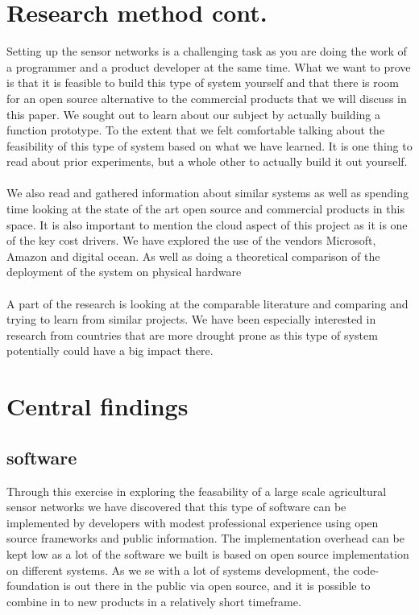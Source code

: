\documentclass[]{uiophd}
\begin{document}
\section{Research method cont.}
Setting up the sensor networks is a challenging task as you are doing the work of a programmer and a product developer at the same time. What we want to prove is that it is feasible to build this type of system yourself and that there is room for an open source alternative to the commercial products that we will discuss in this paper. We sought out to learn about our subject by actually building a function prototype. To the extent that we felt comfortable talking about the feasibility of this type of system based on what we have learned. It is one thing to read about prior experiments, but a whole other to actually build it out yourself.
\\\\
We also read and gathered information about similar systems as well as spending time looking at the state of the art open source and commercial products in this space. It is also important to mention the cloud aspect of this project as it is one of the key cost drivers. We have explored the use of the vendors Microsoft, Amazon and digital ocean. As well as doing a theoretical comparison of the deployment of the system on physical hardware
\\\\
A part of the research is looking at the comparable literature and comparing and trying to learn from similar projects. We have been especially interested in research from countries that are more drought prone as this type of system potentially could have a big impact there.



\section{Central findings}
\subsection{software}
Through this exercise in exploring the feasability of a large scale agricultural sensor networks we have discovered that this type of software can be implemented by developers with modest professional experience using open source frameworks and public information. The implementation overhead can be kept low as a lot of the software we built is based on open source implementation on different systems. As we se with a lot of systems development, the code-foundation is out there in the public via open source, and it is possible to combine in to new products in a relatively short timeframe.
\end{document}
